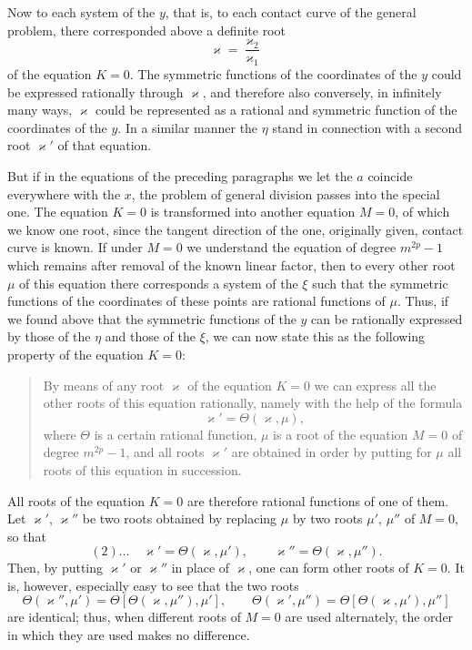 \documentclass[10pt]{article}
\begin{document}
Now to each system of the \(y\), that is, to each contact curve of the general problem, there corresponded above a definite root
\[
\varkappa=\frac{\varkappa_2}{\varkappa_1}
\]
of the equation \(K=0\). The symmetric functions of the coordinates of the \(y\) could be expressed rationally through \(\varkappa\), and therefore also conversely, in infinitely many ways, \(\varkappa\) could be represented as a rational and symmetric function of the coordinates of the \(y\). In a similar manner the \(\eta\) stand in connection with a second root \(\varkappa'\) of that equation.

But if in the equations of the preceding paragraphs we let the \(a\) coincide everywhere with the \(x\), the problem of general division passes into the special one. The equation \(K=0\) is transformed into another equation \(M=0\), of which we know one root, since the tangent direction of the one, originally given, contact curve is known. If under \(M=0\) we understand the equation of degree \(m^{2p}-1\) which remains after removal of the known linear factor, then to every other root \(\mu\) of this equation there corresponds a system of the \(\xi\) such that the symmetric functions of the coordinates of these points are rational functions of \(\mu\). Thus, if we found above that the symmetric functions of the \(y\) can be rationally expressed by those of the \(\eta\) and those of the \(\xi\), we can now state this as the following property of the equation \(K=0\):

\begin{quote}
By means of any root \(\varkappa\) of the equation \(K=0\) we can express all the other roots of this equation rationally, namely with the help of the formula
\[
\varkappa'=\Theta(\varkappa,\mu),
\]
where \(\Theta\) is a certain rational function, \(\mu\) is a root of the equation \(M=0\) of degree \(m^{2p}-1\), and all roots \(\varkappa'\) are obtained in order by putting for \(\mu\) all roots of this equation in succession.
\end{quote}

All roots of the equation \(K=0\) are therefore rational functions of one of them. Let \(\varkappa'\), \(\varkappa''\) be two roots obtained by replacing \(\mu\) by two roots \(\mu'\), \(\mu''\) of \(M=0\), so that
\[
(2)\ldots\quad
\varkappa'=\Theta(\varkappa,\mu'),\qquad \varkappa''=\Theta(\varkappa,\mu'').
\]
Then, by putting \(\varkappa'\) or \(\varkappa''\) in place of \(\varkappa\), one can form other roots of \(K=0\). It is, however, especially easy to see that the two roots
\[
\Theta(\varkappa'',\mu')=\Theta[\Theta(\varkappa,\mu''),\mu'],
\qquad
\Theta(\varkappa',\mu'')=\Theta[\Theta(\varkappa,\mu'),\mu'']
\]
are identical; thus, when different roots of \(M=0\) are used alternately, the order in which they are used makes no difference.
\end{document}
